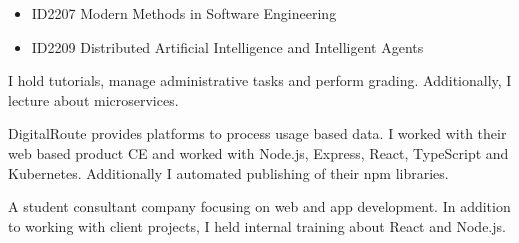 \documentclass[10pt,a4paper]{altacv}
\begin{document}

\begin{fullwidth}
\makecvheader
\end{fullwidth}





\begin{itemize}
    \item ID2207 Modern Methods in Software Engineering
    \item ID2209 Distributed Artificial Intelligence and Intelligent Agents
\end{itemize}

I hold tutorials, manage administrative tasks and perform grading. Additionally, I lecture about microservices. 

\divider

DigitalRoute provides platforms to process usage based data. I worked with their web based product CE and worked with Node.js, Express, React, TypeScript and Kubernetes. Additionally I automated publishing of their npm libraries.

\divider


A student consultant company focusing on web and app development. In addition to working with client projects, I held internal training about React and Node.js.
\end{document}
